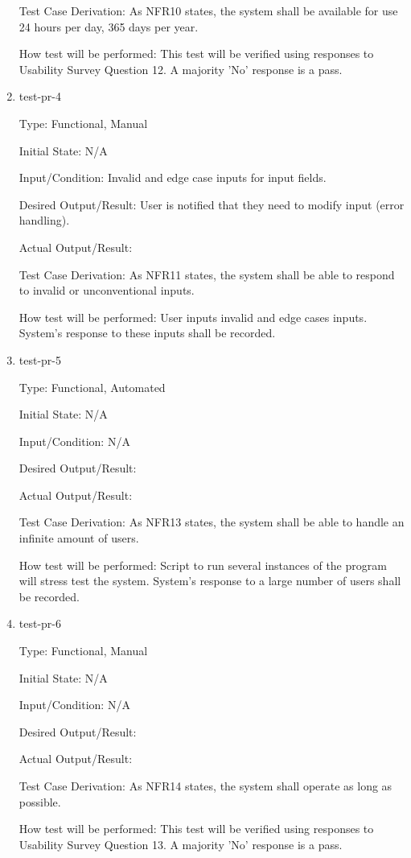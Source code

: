 \documentclass[12pt, titlepage]{article}
\begin{document}
\begin{enumerate}
Test Case Derivation: As NFR10 states, the system shall be available for use 24 hours per day, 365 days per year.

How test will be performed: This test will be verified using responses to Usability Survey Question 12. A majority 'No' response is a pass.

\item{test-pr-4\\}

Type: Functional, Manual

Initial State: N/A	

Input/Condition: Invalid and edge case inputs for input fields. 

Desired Output/Result:  User is notified that they need to modify input (error handling). 

Actual Output/Result:

Test Case Derivation: As NFR11 states, the system shall be able to respond to invalid or unconventional inputs.

How test will be performed: User inputs invalid and edge cases inputs. System's response to these inputs shall be recorded.

\item{test-pr-5\\}

Type: Functional, Automated

Initial State: N/A	

Input/Condition: N/A

Desired Output/Result:  

Actual Output/Result:

Test Case Derivation: As NFR13 states, the system shall be able to handle an infinite amount of users.

How test will be performed: Script to run several instances of the program will stress test the system. System's response to a large number of users shall be recorded. 

\item{test-pr-6\\}

Type: Functional, Manual

Initial State: N/A	

Input/Condition: N/A		

Desired Output/Result:  

Actual Output/Result:

Test Case Derivation: As NFR14 states, the system shall operate as long as possible.

How test will be performed: This test will be verified using responses to Usability Survey Question 13. A majority 'No' response is a pass.

\end{enumerate}
\end{document}
